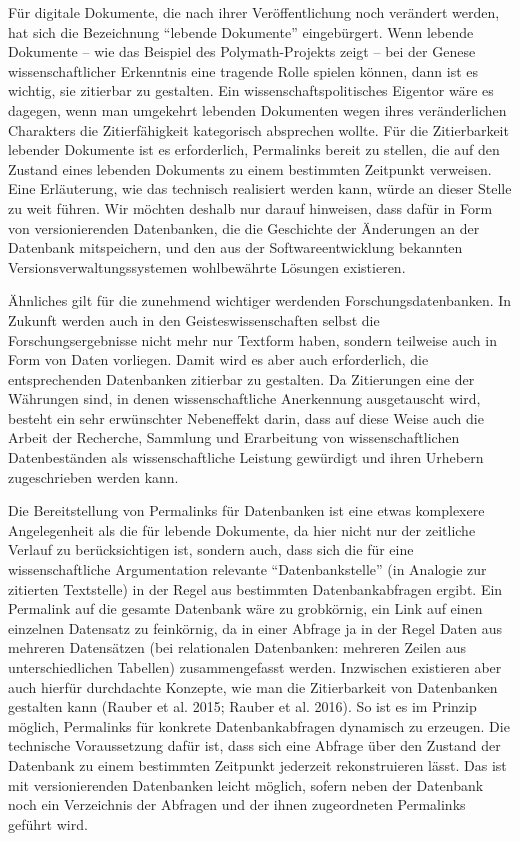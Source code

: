 \documentclass[12pt, a4paper]{article}
\begin{document}
Für digitale Dokumente, die nach ihrer Veröffentlichung noch verändert
werden, hat sich die Bezeichnung "`lebende Dokumente"'
eingebürgert. Wenn lebende Dokumente -- wie das Beispiel des
Polymath-Projekts zeigt -- bei der Genese wissenschaftlicher
Erkenntnis eine tragende Rolle spielen können, dann ist es wichtig,
sie zitierbar zu gestalten. Ein wissenschaftspolitisches Eigentor wäre
es dagegen, wenn man umgekehrt lebenden Dokumenten wegen ihres
veränderlichen Charakters die Zitierfähigkeit kategorisch absprechen
wollte. Für die Zitierbarkeit lebender Dokumente ist es erforderlich,
Permalinks bereit zu stellen, die auf den Zustand eines lebenden
Dokuments zu einem bestimmten Zeitpunkt verweisen. Eine Erläuterung,
wie das technisch realisiert werden kann, würde an dieser Stelle zu
weit führen. Wir möchten deshalb nur darauf hinweisen, dass dafür in
Form von versionierenden Datenbanken, die die Geschichte der
Änderungen an der Datenbank mitspeichern, und den aus der
Softwareentwicklung bekannten Versionsverwaltungssystemen wohlbewährte
Lösungen existieren.

Ähnliches gilt für die zunehmend wichtiger werdenden
Forschungsdatenbanken. In Zukunft werden auch in den
Geisteswissenschaften selbst die Forschungsergebnisse nicht mehr nur
Textform haben, sondern teilweise auch in Form von Daten vorliegen.
Damit wird es aber auch erforderlich, die entsprechenden Datenbanken
zitierbar zu gestalten. Da Zitierungen eine der Währungen sind, in denen
wissenschaftliche Anerkennung ausgetauscht wird, besteht ein sehr
erwünschter Nebeneffekt darin, dass auf diese Weise auch die Arbeit der
Recherche, Sammlung und Erarbeitung von wissenschaftlichen
Datenbeständen als wissenschaftliche Leistung gewürdigt und ihren
Urhebern zugeschrieben werden kann.

Die Bereitstellung von Permalinks für Datenbanken ist eine etwas
komplexere Angelegenheit als die für lebende Dokumente, da hier nicht
nur der zeitliche Verlauf zu berücksichtigen ist, sondern auch, dass
sich die für eine wissenschaftliche Argumentation relevante
"`Datenbankstelle"' (in Analogie zur zitierten Textstelle) in der
Regel aus bestimmten Datenbankabfragen ergibt. Ein Permalink auf die
gesamte Datenbank wäre zu grobkörnig, ein Link auf einen einzelnen
Datensatz zu feinkörnig, da in einer Abfrage ja in der Regel Daten aus
mehreren Datensätzen (bei relationalen Datenbanken: mehreren Zeilen
aus unterschiedlichen Tabellen) zusammengefasst werden. Inzwischen
existieren aber auch hierfür durchdachte Konzepte, wie man die
Zitierbarkeit von Datenbanken gestalten kann (Rauber et al. 2015;
Rauber et al. 2016). So ist es im Prinzip möglich, Permalinks für
konkrete Datenbankabfragen dynamisch zu erzeugen. Die technische
Voraussetzung dafür ist, dass sich eine Abfrage über den Zustand der
Datenbank zu einem bestimmten Zeitpunkt jederzeit rekonstruieren
lässt. Das ist mit versionierenden Datenbanken leicht möglich, sofern
neben der Datenbank noch ein Verzeichnis der Abfragen und der ihnen
zugeordneten Permalinks geführt wird.
\end{document}

